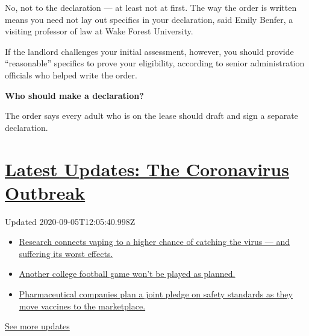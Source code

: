 No, not to the declaration --- at least not at first. The way the order
is written means you need not lay out specifics in your declaration,
said Emily Benfer, a visiting professor of law at Wake Forest
University.

If the landlord challenges your initial assessment, however, you should
provide ``reasonable'' specifics to prove your eligibility, according to
senior administration officials who helped write the order.

\textbf{Who should make a declaration?}

The order says every adult who is on the lease should draft and sign a
separate declaration.

\hypertarget{latest-updates-the-coronavirus-outbreak}{%
\section{\texorpdfstring{\href{https://www.nytimes3xbfgragh.onion/2020/09/04/world/covid-19-coronavirus.html?action=click\&pgtype=Article\&state=default\&region=MAIN_CONTENT_1\&context=storylines_live_updates}{Latest
Updates: The Coronavirus
Outbreak}}{Latest Updates: The Coronavirus Outbreak}}\label{latest-updates-the-coronavirus-outbreak}}

Updated 2020-09-05T12:05:40.998Z

\begin{itemize}
\tightlist
\item
  \href{https://www.nytimes3xbfgragh.onion/2020/09/04/world/covid-19-coronavirus.html?action=click\&pgtype=Article\&state=default\&region=MAIN_CONTENT_1\&context=storylines_live_updates\#link-1654f6ad}{Research
  connects vaping to a higher chance of catching the virus --- and
  suffering its worst effects.}
\item
  \href{https://www.nytimes3xbfgragh.onion/2020/09/04/world/covid-19-coronavirus.html?action=click\&pgtype=Article\&state=default\&region=MAIN_CONTENT_1\&context=storylines_live_updates\#link-52e4198a}{Another
  college football game won't be played as planned.}
\item
  \href{https://www.nytimes3xbfgragh.onion/2020/09/04/world/covid-19-coronavirus.html?action=click\&pgtype=Article\&state=default\&region=MAIN_CONTENT_1\&context=storylines_live_updates\#link-181cef0}{Pharmaceutical
  companies plan a joint pledge on safety standards as they move
  vaccines to the marketplace.}
\end{itemize}

\href{https://www.nytimes3xbfgragh.onion/2020/09/04/world/covid-19-coronavirus.html?action=click\&pgtype=Article\&state=default\&region=MAIN_CONTENT_1\&context=storylines_live_updates}{See
more updates}

